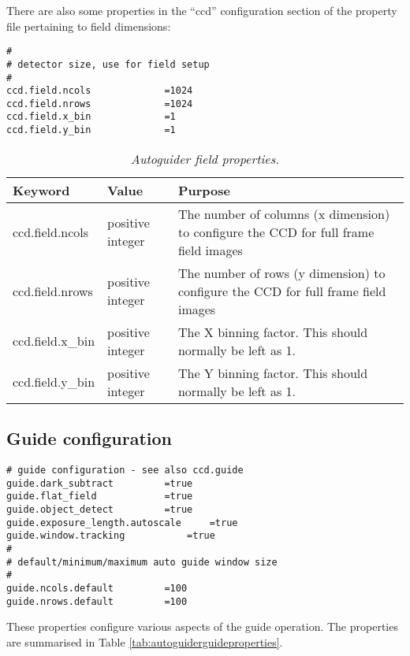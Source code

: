 \documentclass[10pt,a4paper]{article}
\begin{document}
There are also some properties in the ``ccd'' configuration section of the property file pertaining to field dimensions:

\begin{verbatim}
#
# detector size, use for field setup
#
ccd.field.ncols				=1024
ccd.field.nrows				=1024
ccd.field.x_bin				=1
ccd.field.y_bin				=1
\end{verbatim}

\begin{table}[!h]
\begin{center}
\begin{tabular}{|l|l|p{20em}|}
\hline
{\bf Keyword}    & {\bf Value} & {\bf Purpose} \\ \hline
ccd.field.ncols  & positive integer & The number of columns (x dimension) to configure the CCD for full frame field images \\ \hline
ccd.field.nrows  & positive integer & The number of rows (y dimension) to configure the CCD for full frame field images \\ \hline
ccd.field.x\_bin & positive integer & The X binning factor. This should normally be left as 1. \\ \hline
ccd.field.y\_bin & positive integer & The Y binning factor. This should normally be left as 1. \\ \hline
\end{tabular}
\end{center}
\caption{\em Autoguider field properties.}
\label{tab:autoguiderfieldproperties}
\end{table}


\subsection{Guide configuration}

\begin{verbatim}
# guide configuration - see also ccd.guide
guide.dark_subtract			=true
guide.flat_field			=true
guide.object_detect			=true
guide.exposure_length.autoscale		=true
guide.window.tracking			=true
#
# default/minimum/maximum auto guide window size
#
guide.ncols.default			=100
guide.nrows.default			=100
\end{verbatim}

These properties configure various aspects of the guide operation. The properties are summarised in Table \ref{tab:autoguiderguideproperties}.
\end{document}
